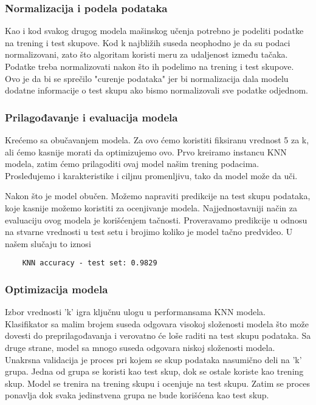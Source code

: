\documentclass[a4paper,12pt]{article}
\begin{document}
\subsubsection{Normalizacija i podela podataka}
Kao i kod svakog drugog modela mašinskog učenja potrebno je podeliti podatke na trening i test skupove. Kod k najbližih suseda neophodno je da su podaci normalizovani, zato što algoritam koristi meru za udaljenost između tačaka.
Podatke treba normalizovati nakon što ih podelimo na trening i test skupove. Ovo je da bi se sprečilo "curenje podataka" jer bi normalizacija dala modelu dodatne informacije o test skupu ako bismo normalizovali sve podatke odjednom.

\subsubsection{Prilagođavanje i evaluacija modela}
Krećemo sa obučavanjem modela. Za ovo ćemo koristiti fiksiranu vrednost 5 za k, ali ćemo kasnije morati da optimizujemo ovo. Prvo kreiramo instancu KNN modela, zatim ćemo prilagoditi ovaj model našim trening podacima. Prosleđujemo i karakteristike i ciljnu promenljivu, tako da model može da uči.

Nakon što je model obučen. Možemo napraviti predikcije na test skupu podataka, koje kasnije možemo koristiti za ocenjivanje modela.
Najjednostavniji način za evaluaciju ovog modela je korišćenjem tačnosti. Proveravamo predikcije u odnosu na stvarne vrednosti u test setu i brojimo koliko je model tačno predvideo.
U našem slučaju to iznosi

\begin{verbatim}
    KNN accuracy - test set: 0.9829
\end{verbatim}

\subsubsection{Optimizacija modela}
Izbor vrednosti 'k' igra ključnu ulogu u performansama KNN modela. Klasifikator sa malim brojem suseda odgovara visokoj složenosti modela što može dovesti do preprilagođavanja i verovatno će loše raditi na test skupu podataka. Sa druge strane, model sa mnogo suseda odgovara niskoj složenosti modela.
Unakrsna validacija je proces pri kojem se skup podataka nasumično deli na 'k' grupa. Jedna od grupa se koristi kao test skup, dok se ostale koriste kao trening skup. Model se trenira na trening skupu i ocenjuje na test skupu. Zatim se proces ponavlja dok svaka jedinstvena grupa ne bude korišćena kao test skup.
\end{document}
